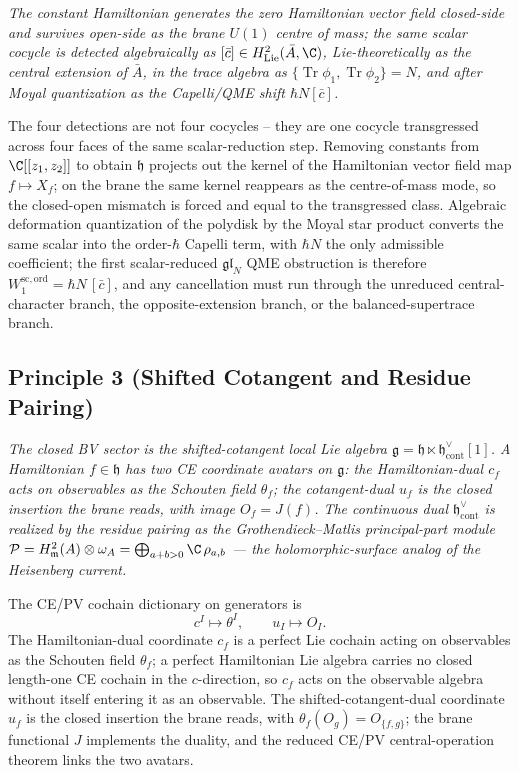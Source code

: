 \emph{The constant Hamiltonian generates the zero Hamiltonian vector
field closed-side and survives open-side as the brane \(U(1)\)
centre of mass; the same scalar cocycle is detected algebraically as
\([\bar c]\in H^2_{\mathrm{Lie}}(\bar A,\C)\), Lie-theoretically as the
central extension of \(\bar A\), in the trace algebra as
\(\{\operatorname{Tr}\phi_1,\operatorname{Tr}\phi_2\}=N\), and after
Moyal quantization as the Capelli/QME shift \(\hbar N[\bar c]\).}

The four detections are not four cocycles -- they are one cocycle
transgressed across four faces of the same scalar-reduction step.
Removing constants from \(\C[[z_1,z_2]]\) to obtain \(\mathfrak h\)
projects out the kernel of the Hamiltonian vector field map
\(f\mapsto X_f\); on the brane the same kernel reappears as the
centre-of-mass mode, so the closed-open mismatch is forced and equal
to the transgressed class.  Algebraic deformation quantization of the
polydisk by the Moyal star product converts the same scalar into the
order-\(\hbar\) Capelli term, with \(\hbar N\) the only admissible
coefficient; the first scalar-reduced \(\mathfrak{gl}_N\) QME
obstruction is therefore \(W_1^{\mathrm{sc,ord}}=\hbar N\,[\bar c]\),
and any cancellation must run through the unreduced central-character
branch, the opposite-extension branch, or the balanced-supertrace
branch.

\subsection*{Principle 3 (Shifted Cotangent and Residue Pairing)}

\emph{The closed BV sector is the shifted-cotangent local Lie algebra
\(\mathfrak g=\mathfrak h\ltimes\mathfrak h^\vee_{\mathrm{cont}}[1]\).
A Hamiltonian \(f\in\mathfrak h\) has two CE coordinate avatars on
\(\mathfrak g\): the Hamiltonian-dual \(c_f\) acts on observables as
the Schouten field \(\theta_f\); the cotangent-dual \(u_f\) is the
closed insertion the brane reads, with image \(O_f=J(f)\).  The
continuous dual \(\mathfrak h^\vee_{\mathrm{cont}}\) is realized by
the residue pairing as the Grothendieck--Matlis principal-part module
\(\mathcal P=H^2_{\mathfrak m}(A)\otimes\omega_A
=\bigoplus_{a+b>0}\C\,\rho_{a,b}\) --- the holomorphic-surface analog
of the Heisenberg current.}

The CE/PV cochain dictionary on generators is
\[
  c^I\longmapsto\theta^I,\qquad u_I\longmapsto O_I .
\]
The Hamiltonian-dual coordinate \(c_f\) is a perfect Lie cochain
acting on observables as the Schouten field \(\theta_f\); a perfect
Hamiltonian Lie algebra carries no closed length-one CE cochain in
the \(c\)-direction, so \(c_f\) acts on the observable algebra
without itself entering it as an observable.  The
shifted-cotangent-dual coordinate \(u_f\) is the closed insertion the
brane reads, with \(\theta_f(O_g)=O_{\{f,g\}}\); the brane functional
\(J\) implements the duality, and the reduced CE/PV
central-operation theorem links the two avatars.

